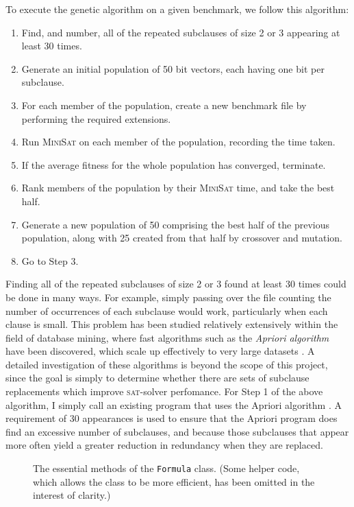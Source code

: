 \documentclass[proof,pdftex,11pt,a4,titlepage]{article}
\def\code{\lstinline[basicstyle=\textsize\ttfamily]}
\newcommand{\sat}{\textsc{sat}}
\begin{document}
To execute the genetic algorithm on a given benchmark, we follow this algorithm:

\begin{samepage}
  \begin{enumerate}
    \item Find, and number, all of the repeated subclauses of size 2 or 3 appearing at least 30 times.
    \item Generate an initial population of 50 bit vectors, each having one bit per subclause.
    \item For each member of the population, create a new benchmark file by performing the required extensions.
    \item Run \textsc{MiniSat} on each member of the population, recording the time taken.
    \item If the average fitness for the whole population has converged, terminate.
    \item Rank members of the population by their \textsc{MiniSat} time, and take the best half.
    \item Generate a new population of 50 comprising the best half of the previous population, along with 25 created from that half by crossover and mutation.
    \item Go to Step 3.
  \end{enumerate}
\end{samepage}

Finding all of the repeated subclauses of size 2 or 3 found at least 30 times could be done in many ways. For example, simply passing over the file counting the number of occurrences of each subclause would work, particularly when each clause is small. This problem has been studied relatively extensively within the field of database mining, where fast algorithms such as the \emph{Apriori algorithm} have been discovered, which scale up effectively to very large datasets \cite{Agrawal:1994}. A detailed investigation of these algorithms is beyond the scope of this project, since the goal is simply to determine whether there are sets of subclause replacements which improve \sat{}-solver perfomance. For Step 1 of the above algorithm, I simply call an existing program that uses the Apriori algorithm \cite{Borgelt:2003}. A requirement of 30 appearances is used to ensure that the Apriori program does find an excessive number of subclauses, and because those subclauses that appear more often yield a greater reduction in redundancy when they are replaced.

\begin{figure}[p]
  
  \caption{The essential methods of the \code{Formula} class. (Some helper code, which allows the class to be more efficient, has been omitted in the interest of clarity.)}
  \label{fig:formula-class}
\end{figure}
\end{document}
